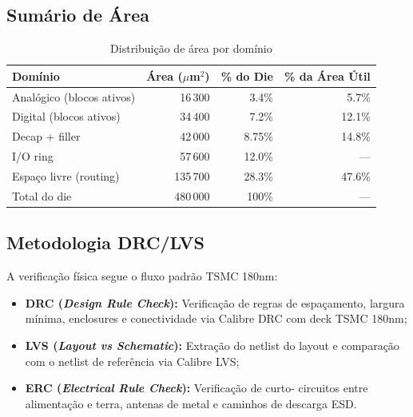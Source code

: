 \documentclass[12pt,a4paper]{article}
\begin{document}
\subsection{Sumário de Área}

\begin{table}[H]
  \centering
  \caption{Distribuição de área por domínio}
  \label{tab:area_summary}
  \begin{tabular}{lrrr}
    \toprule
    \textbf{Domínio} & \textbf{Área ($\mu$m$^2$)} &
    \textbf{\% do Die} & \textbf{\% da Área Útil} \\
    \midrule
    Analógico (blocos ativos) & 16\,300 & 3.4\% & 5.7\% \\
    Digital (blocos ativos)   & 34\,400 & 7.2\% & 12.1\% \\
    Decap + filler            & 42\,000 & 8.75\% & 14.8\% \\
    I/O ring                  & 57\,600 & 12.0\% & --- \\
    Espaço livre (routing)    & 135\,700 & 28.3\% & 47.6\% \\
    Total do die              & 480\,000 & 100\% & --- \\
    \bottomrule
  \end{tabular}
\end{table}

\subsection{Metodologia DRC/LVS}

A verificação física segue o fluxo padrão TSMC 180nm:

\begin{itemize}
  \item \textbf{DRC (\textit{Design Rule Check}):} Verificação de regras de
        espaçamento, largura mínima, enclosures e conectividade via Calibre
        DRC com deck TSMC 180nm;
  \item \textbf{LVS (\textit{Layout vs Schematic}):} Extração do netlist do
        layout e comparação com o netlist de referência via Calibre LVS;
  \item \textbf{ERC (\textit{Electrical Rule Check}):} Verificação de curto-
        circuitos entre alimentação e terra, antenas de metal e caminhos
        de descarga ESD.
\end{itemize}

\newpage

\end{document}
